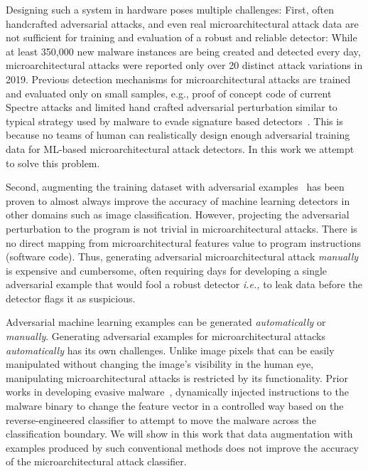 Designing such a system in hardware poses multiple challenges: First, often handcrafted adversarial attacks, and even real microarchitectural attack data are not sufficient for training and evaluation of a robust and reliable detector: While at least 350,000 new malware instances are being created and detected every day, microarchitectural attacks were reported only over 20 distinct attack variations in 2019. 
Previous detection mechanisms for microarchitectural attacks are trained and evaluated only on small samples, e.g., proof of concept code of current Spectre attacks and limited hand crafted adversarial perturbation similar to typical strategy 
used by malware to evade signature based
detectors~\cite{PaulKocher,paulKocherSpectreAttacks}. This is because no teams of human can realistically design enough adversarial training data for ML-based microarchitectural attack detectors. In this work we attempt to solve this problem. 



Second, augmenting the training dataset with adversarial examples~\cite{szegedy2014going, Goodfellow2015ADVexample, moosavidezfooli2016deepfool} has been proven to almost always improve the accuracy of machine learning detectors in other domains such as image classification. However,  projecting the adversarial perturbation to the program is not trivial in microarchitectural attacks. There is no direct mapping from microarchitectural features value to program instructions (software code). Thus, generating adversarial microarchitectural attack {\em manually} is  expensive and cumbersome, often requiring days for developing a single adversarial example that would fool a robust detector {\em i.e.,} to leak data before the detector flags it as suspicious. 

Adversarial machine learning examples can be generated {\em automatically}  or {\em manually}. Generating adversarial examples for microarchitectural attacks {\em automatically} has its own challenges.  
Unlike image pixels that can be easily manipulated without changing the image's visibility in the human eye, manipulating microarchitectural attacks is restricted by its functionality. 
Prior works in developing evasive malware~\cite{RHMD2017}, dynamically injected instructions to the malware binary to change the feature vector in a controlled way based on the reverse-engineered classifier to attempt to move the malware across the classification boundary. We will show in this work that data augmentation with examples produced by such conventional methods does not improve the accuracy of the microarchitectural attack classifier. 

